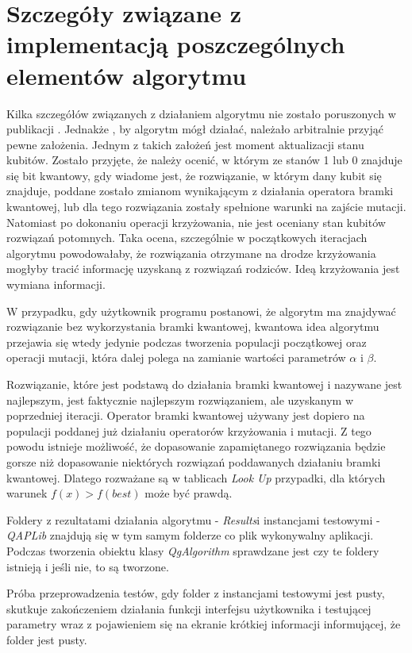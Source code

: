 \section{Szczegóły związane z implementacją poszczególnych elementów algorytmu}
Kilka szczegółów związanych z działaniem algorytmu nie zostało poruszonych w publikacji \cite{NPQGA}. Jednakże , by algorytm mógł działać, należało arbitralnie przyjąć pewne założenia. Jednym z takich założeń jest moment aktualizacji stanu kubitów. Zostało przyjęte, że należy ocenić, w którym ze stanów 1 lub 0 znajduje się bit kwantowy, gdy wiadome jest, że rozwiązanie, w którym dany kubit się znajduje, poddane zostało zmianom wynikającym z działania operatora bramki kwantowej, lub dla tego rozwiązania zostały spełnione warunki na zajście mutacji. Natomiast po dokonaniu operacji krzyżowania, nie jest oceniany stan kubitów rozwiązań potomnych. Taka ocena, szczególnie w początkowych iteracjach algorytmu powodowałaby, że rozwiązania otrzymane na drodze krzyżowania mogłyby tracić informację uzyskaną z rozwiązań rodziców. Ideą krzyżowania jest wymiana informacji.

W przypadku, gdy użytkownik programu postanowi, że algorytm ma znajdywać rozwiązanie bez wykorzystania bramki kwantowej, kwantowa idea algorytmu przejawia się wtedy jedynie podczas tworzenia populacji początkowej oraz operacji mutacji, która dalej polega na zamianie wartości parametrów $\alpha$ i $\beta$.

Rozwiązanie, które jest podstawą do działania bramki kwantowej i nazywane jest najlepszym, jest faktycznie najlepszym rozwiązaniem, ale uzyskanym w poprzedniej iteracji. Operator bramki kwantowej używany jest dopiero na populacji poddanej już działaniu operatorów krzyżowania i mutacji. Z tego powodu istnieje możliwość, że dopasowanie zapamiętanego rozwiązania będzie gorsze niż dopasowanie niektórych rozwiązań poddawanych działaniu bramki kwantowej. Dlatego rozważane są w tablicach \textit{Look Up} przypadki, dla których warunek $f(x)>f(best)$ może być prawdą.

Foldery z rezultatami działania algorytmu - \textit{Results}i instancjami testowymi - \textit{QAPLib} znajdują się w tym samym folderze co plik wykonywalny aplikacji. Podczas tworzenia obiektu klasy \textit{QgAlgorithm} sprawdzane jest czy te foldery istnieją i jeśli nie, to są tworzone.

Próba przeprowadzenia testów, gdy folder z instancjami testowymi jest pusty, skutkuje zakończeniem działania funkcji interfejsu użytkownika i testującej parametry wraz z pojawieniem się na ekranie krótkiej informacji informującej, że folder jest pusty.